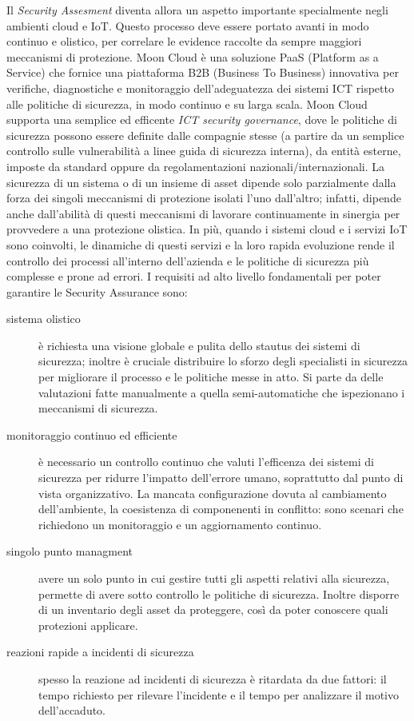 Il \textit{Security Assesment} diventa allora un aspetto importante specialmente negli ambienti cloud e IoT. Questo processo
deve essere portato avanti in modo continuo e olistico, per correlare le evidence raccolte da sempre maggiori meccanismi di 
protezione. \cite{mooncloud-semi-automatic-and-trustworthy}
\newline
Moon Cloud è una soluzione PaaS (Platform as a Service) che fornice una piattaforma B2B (Business To Business) innovativa per verifiche, 
diagnostiche e monitoraggio dell'adeguatezza dei sistemi ICT rispetto alle politiche di sicurezza, in modo continuo e su larga scala.
Moon Cloud supporta una semplice ed efficente \textit{ICT security governance}, dove le politiche di sicurezza possono
essere definite dalle compagnie stesse (a partire da un semplice controllo sulle vulnerabilità a linee guida di
sicurezza interna), da entità esterne, imposte da standard oppure da regolamentazioni nazionali/internazionali.
\newline
La sicurezza di un sistema o di un insieme di asset dipende solo parzialmente dalla forza dei singoli meccanismi di protezione isolati
l'uno dall'altro; infatti, dipende anche dall'abilità di questi meccanismi di lavorare continuamente in sinergia per provvedere a
una protezione olistica.
In più, quando i sistemi cloud e i servizi IoT sono coinvolti, le dinamiche di questi servizi e la loro rapida evoluzione rende il 
controllo dei processi all'interno dell'azienda e le politiche di sicurezza più complesse e prone ad errori.
\newline
I requisiti ad alto livello fondamentali per poter garantire le Security Assurance sono:
\begin{description}
	\item[sistema olistico] è richiesta una visione globale e pulita dello stautus dei sistemi di sicurezza; inoltre è cruciale 
	distribuire lo sforzo degli specialisti in sicurezza per migliorare il processo e le politiche messe in atto. Si parte da 
	delle valutazioni fatte manualmente a quella semi-automatiche che ispezionano i meccanismi di sicurezza. 
	\item[monitoraggio continuo ed efficiente] è necessario un controllo continuo che valuti l'efficenza dei sistemi di sicurezza 
	per ridurre l'impatto dell'errore umano, soprattutto dal punto di vista organizzativo. La mancata configurazione dovuta al 
	cambiamento dell'ambiente, la coesistenza di componenenti in conflitto: sono scenari che richiedono un monitoraggio e un 
	aggiornamento continuo.
	\item[singolo punto managment] avere un solo punto in cui gestire tutti gli aspetti relativi alla sicurezza, permette di avere 
	sotto controllo le politiche di sicurezza. Inoltre disporre di un inventario degli asset da proteggere, così da poter conoscere 
	quali protezioni applicare.
	\item[reazioni rapide a incidenti di sicurezza] spesso la reazione ad incidenti di sicurezza è ritardata da due fattori: il tempo 
	richiesto per rilevare l'incidente e il tempo per analizzare il motivo dell'accaduto.
\end{description}


